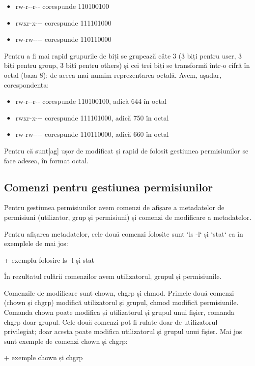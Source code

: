 \begin{itemize}
	\item rw-r-{}-r-{}- corespunde 110100100
	\item rwxr-x-{}-{}- corespunde 111101000
	\item rw-rw-{}-{}-{}- corespunde 110110000
\end{itemize}

Pentru a fi mai rapid grupurile de biți se grupează câte 3 (3 biți pentru user,
3 biți pentru group, 3 bițî pentru others) și cei trei biți se transformă într-o
cifră în octal (baza 8); de aceea mai numim reprezentarea octală. Avem, așadar,
corespondența:

\begin{itemize}
	\item rw-r-{}-r-{}- corespunde 110100100, adică 644 în octal
	\item rwxr-x-{}-{}- corespunde 111101000, adică 750 în octal
	\item rw-rw-{}-{}-{}- corespunde 110110000, adică 660 în octal
\end{itemize}

Pentru că sunt[ag] ușor de modificat și rapid de folosit gestiunea permisiunilor
se face adesea, în format octal.

\subsection{Comenzi pentru gestiunea permisiunilor}
\label{sec:users-fs-perms-cmd}

Pentru gestiunea permisiunilor avem comenzi de afișare a metadatelor de
permisiuni (utilizator, grup și permisiuni) și comenzi de modificare a
metadatelor.

Pentru afișarea metadatelor, cele două comenzi folosite sunt `ls -l` și `stat`
ca în exemplele de mai jos:

+ exemplu folosire ls -l și stat

În rezultatul rulării comenzilor avem utilizatorul, grupul și permisiunile.

Comenzile de modificare sunt chown, chgrp și chmod. Primele două comenzi (chown
și chgrp) modifică utilizatorul și grupul, chmod modifică permisiunile. Comanda
chown poate modifica și utilizatorul și grupul unui fișier, comanda chgrp doar
grupul. Cele două comenzi pot fi rulate doar de utilizatorul privilegiat; doar
acesta poate modifica utilizatorul și grupul unui fișier. Mai jos sunt exemple
de comenzi chown și chgrp:

+ exemple chown și chgrp


